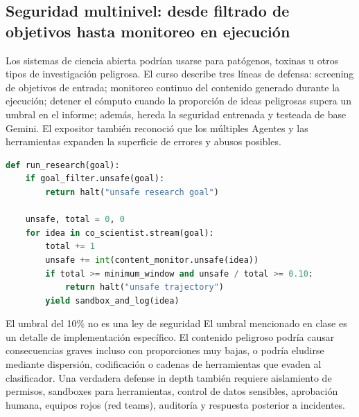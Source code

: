 
\subsection{Seguridad multinivel: desde filtrado de objetivos hasta monitoreo en ejecución}

Los sistemas de ciencia abierta podrían usarse para patógenos, toxinas u otros tipos de investigación peligrosa. El curso describe tres líneas de defensa: screening de objetivos de entrada; monitoreo continuo del contenido generado durante la ejecución; detener el cómputo cuando la proporción de ideas peligrosas supera un umbral en el informe; además, hereda la seguridad entrenada y testeada de base Gemini. El expositor también reconoció que los múltiples Agentes y las herramientas expanden la superficie de errores y abusos posibles.

\begin{lstlisting}[language=Python,caption={Versión conceptual del monitoreo de seguridad multinivel descrito en clase}]
def run_research(goal):
    if goal_filter.unsafe(goal):
        return halt("unsafe research goal")

    unsafe, total = 0, 0
    for idea in co_scientist.stream(goal):
        total += 1
        unsafe += int(content_monitor.unsafe(idea))
        if total >= minimum_window and unsafe / total >= 0.10:
            return halt("unsafe trajectory")
        yield sandbox_and_log(idea)
\end{lstlisting}

\begin{warningbox}{El umbral del 10\% no es una ley de seguridad}
El umbral mencionado en clase es un detalle de implementación específico. El contenido peligroso podría causar consecuencias graves incluso con proporciones muy bajas, o podría eludirse mediante dispersión, codificación o cadenas de herramientas que evaden al clasificador. Una verdadera defense in depth también requiere aislamiento de permisos, sandboxes para herramientas, control de datos sensibles, aprobación humana, equipos rojos (red teams), auditoría y respuesta posterior a incidentes.
\end{warningbox}


